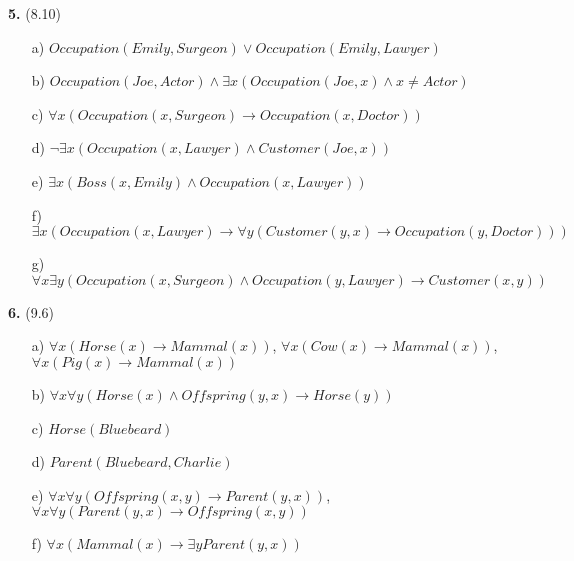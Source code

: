 \documentclass{article}
\begin{document}
\textbf{5.} (8.10)

\begin{itemize}
\item[a)] $Occupation(Emily, Surgeon) \lor Occupation(Emily, Lawyer)$
\item[b)] $Occupation(Joe, Actor) \land \exists x (Occupation(Joe, x) \land x \neq Actor)$
\item[c)] $\forall x (Occupation(x, Surgeon) \rightarrow Occupation(x, Doctor))$
\item[d)] $\lnot \exists x (Occupation(x, Lawyer) \land Customer(Joe, x))$
\item[e)] $\exists x (Boss(x, Emily) \land Occupation(x, Lawyer))$
\item[f)] $\exists x (Occupation(x, Lawyer) \rightarrow \forall y (Customer(y,x) \rightarrow Occupation(y, Doctor)))$
\item[g)] $\forall x \exists y (Occupation(x, Surgeon) \land Occupation(y, Lawyer) \rightarrow Customer(x, y))$
\end{itemize}

\textbf{6.} (9.6)

\begin{itemize}
\item[a)] $\forall x (Horse(x) \rightarrow Mammal(x))$, $\forall x (Cow(x) \rightarrow Mammal(x))$, $\forall x (Pig(x) \rightarrow Mammal(x))$
\item[b)] $\forall x \forall y (Horse(x) \land Offspring(y, x) \rightarrow Horse(y))$
\item[c)] $Horse(Bluebeard)$
\item[d)] $Parent(Bluebeard, Charlie)$
\item[e)] $\forall x \forall y (Offspring(x, y) \rightarrow Parent(y, x))$, $\forall x \forall y (Parent(y, x) \rightarrow Offspring(x, y))$
\item[f)] $\forall x (Mammal(x) \rightarrow \exists y Parent(y, x))$
\end{itemize}
\end{document}
